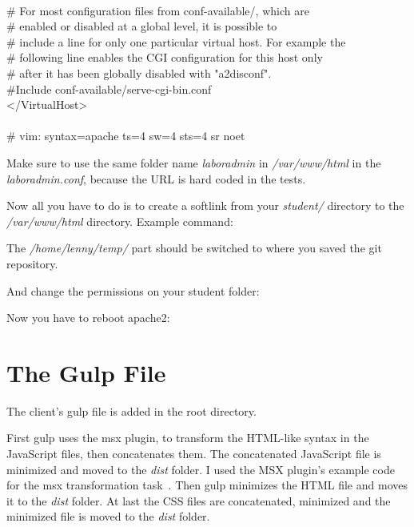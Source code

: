 {	\\
	\# For most configuration files from conf-available/, which are\\
	\# enabled or disabled at a global level, it is possible to\\
	\# include a line for only one particular virtual host. For example the\\
	\# following line enables the CGI configuration for this host only\\
	\# after it has been globally disabled with "a2disconf".\\
	\#Include conf-available/serve-cgi-bin.conf\\
	</VirtualHost>\\
	\\
	\# vim: syntax=apache ts=4 sw=4 sts=4 sr noet
	}

Make sure to use the same folder name \emph{laboradmin} in \emph{/var/www/html} in the \emph{laboradmin.conf}, because the URL is hard coded in the tests.

Now all you have to do is to create a softlink from your\emph{ student/} directory to the \emph{/var/www/html} directory. Example command:

	
The \emph{/home/lenny/temp/} part should be switched to where you saved the git repository.

And change the permissions on your student folder:


Now you have to reboot apache2:


\newpage
\section{The Gulp File}\label{gulp-file}
The client's gulp file is added in the root directory. 

First gulp uses the msx plugin, to transform the HTML-like syntax in the JavaScript files, then concatenates them. The concatenated JavaScript file is minimized and moved to the \emph{dist} folder. I used the MSX plugin's example code for the msx transformation task~\cite{gulp-msx-example}. Then gulp minimizes the HTML file and moves it to the \emph{dist} folder. At last the CSS files are concatenated, minimized and the minimized file is moved to the \emph{dist} folder. 

